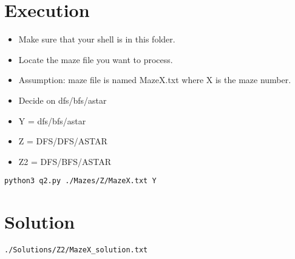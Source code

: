 \documentclass[11pt]{article}
\author{DESKTOP-OEFS7VE}
\date{\today}
\title{}
\begin{document}
\tableofcontents

\section{Execution}
\label{sec:org0a03426}
\begin{itemize}
\item Make sure that your shell is in this folder.
\item Locate the maze file you want to process.
\item Assumption: maze file is named MazeX.txt where X is the maze number.
\item Decide on dfs/bfs/astar
\item Y = dfs/bfs/astar
\item Z = DFS/DFS/ASTAR
\item Z2 = DFS/BFS/ASTAR
\end{itemize}
\lstset{language=shell,label= ,caption= ,captionpos=b,numbers=none}
\begin{lstlisting}
python3 q2.py ./Mazes/Z/MazeX.txt Y
\end{lstlisting}
\section{Solution}
\label{sec:org9c16eaf}
\lstset{language=shell,label= ,caption= ,captionpos=b,numbers=none}
\begin{lstlisting}
./Solutions/Z2/MazeX_solution.txt
\end{lstlisting}
\end{document}
